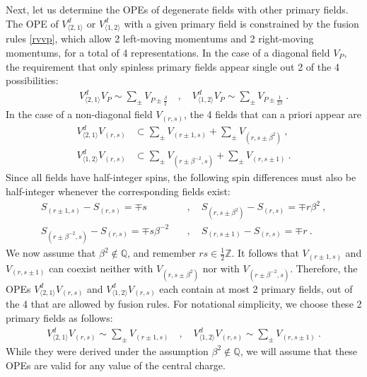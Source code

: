 \documentclass[12pt, a4paper]{article}
\begin{document}
Next, let us determine the OPEs of degenerate fields with other primary fields.
The OPE of $V^d_{\langle 2,1\rangle}$ or $V^d_{\langle 1,2\rangle}$ with a given primary field is constrained by the fusion rules \eqref{rvvp}, which allow 2 left-moving momentums and 2 right-moving momentums, for a total of 4 representations.  In the case of a diagonal field $V_P$, the requirement that only spinless primary fields appear single out 2 of the 4 possibilities:
\begin{align}
 \boxed{V^d_{\langle 2,1\rangle} V_P \sim \sum_\pm V_{P\pm\frac{\beta}{2}}} \quad , \quad \boxed{V^d_{\langle 1,2\rangle} V_P \sim \sum_\pm V_{P\pm\frac{1}{2\beta}}} \ . 
 \label{vpope}
\end{align}
In the case of a non-diagonal field $V_{(r,s)}$, the 4 fields that can a priori appear are
\begin{subequations}
\begin{align}
 V^d_{\langle 2,1\rangle}V_{(r,s)} &\subset \sum_\pm V_{(r\pm 1,s)} + \sum_\pm V_{(r,s\pm \beta^2)}\ ,
 \label{vtovrs}
 \\
 V^d_{\langle 1,2\rangle}V_{(r,s)} &\subset \sum_\pm V_{(r\pm \beta^{-2},s)} + \sum_\pm V_{(r,s\pm 1)}\ .
 \label{votvrs}
\end{align}
\end{subequations}
Since all fields have half-integer spins, the following spin differences must also be half-integer whenever the corresponding fields exist: 
\begin{subequations}
\begin{align}
 S_{(r\pm 1,s)} - S_{(r,s)} = \mp s &\quad , \quad S_{(r,s\pm \beta^2)} - S_{(r,s)} = \mp r\beta^2\ ,
 \label{sdiff1}
 \\
 S_{(r\pm \beta^{-2},s)} - S_{(r,s)} = \mp s\beta^{-2} &\quad , \quad S_{(r,s\pm 1)} - S_{(r,s)} = \mp r\ . 
 \label{sdiff2}
\end{align}
\end{subequations}
We now assume that $\beta^2\notin \mathbb{Q}$, and remember $rs\in\frac12\mathbb{Z}$. It follows that $V_{(r\pm 1,s)}$ and $V_{(r,s\pm 1)}$ can coexist neither with $V_{(r,s\pm \beta^2)}$ nor with $V_{(r\pm \beta^{-2},s)}$. Therefore, the OPEs $V^d_{\langle 2,1\rangle}V_{(r,s)}$ and $V^d_{\langle 1,2\rangle}V_{(r,s)}$ each contain at most 2 primary fields, out of the 4 that are allowed by fusion rules. For notational simplicity, we choose these 2 primary fields as follows: 
\begin{align}
 \boxed{V^d_{\langle 2,1\rangle}V_{(r,s)} \sim \sum_\pm V_{(r\pm 1,s)}} \quad ,\quad
 \boxed{V^d_{\langle 1,2\rangle}V_{(r,s)} \sim \sum_\pm V_{(r,s\pm 1)}}\ . 
 \label{vdvrs}
\end{align}
While they were derived under the assumption $\beta^2\notin \mathbb{Q}$, we will assume that these OPEs are valid for any value of the central charge. 
\end{document}
